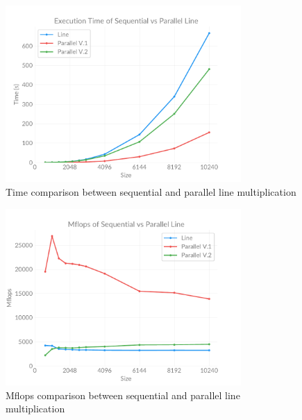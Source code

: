     \begin{figure}[h]
        \centering
        \captionsetup{justification=centering, margin=2cm}
        \includegraphics[width=0.8\textwidth]{pdf/parallel-time}
        \caption{Time comparison between sequential and parallel line multiplication}
        \label{fig:chart:parallel-time}
    \end{figure}

    \begin{figure}[h]
        \centering
        \captionsetup{justification=centering, margin=2cm}
        \includegraphics[width=0.8\textwidth]{pdf/parallel-flops}
        \caption{Mflops comparison between sequential and parallel line multiplication}
        \label{fig:chart:parallel-flops}
    \end{figure}

